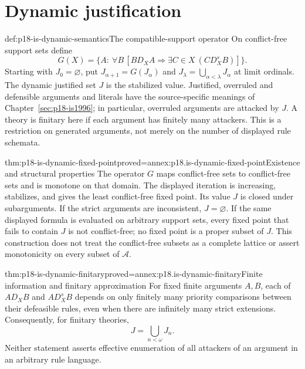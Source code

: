 \section{Dynamic justification}

\begin{hbdefinition}{def:p18-is-dynamic-semantics}{The compatible-support operator}
On conflict-free support sets define
\[
 G(X)=\{A:\ \forall B\,[B D_X A\Rightarrow
                       \exists C\in X\ (C D_X^s B)]\}.
\]
Starting with \(J_0=\varnothing\), put
\(J_{\alpha+1}=G(J_\alpha)\) and
\(J_\lambda=\bigcup_{\alpha<\lambda}J_\alpha\) at limit ordinals.
The dynamic justified set \(J\) is the stabilized value.
Justified, overruled and defensible arguments and literals have
the source-specific meanings of Chapter~\ref{sec:p18-is1996};
in particular, overruled arguments are attacked by \(J\).
A theory is finitary here if each argument has finitely many attackers.
This is a restriction on generated arguments, not merely on the
number of displayed rule schemata.
\end{hbdefinition}

\begin{hbtheorem}{thm:p18-is-dynamic-fixed-point}{proved=annex:p18.is-dynamic-fixed-point}{Existence and structural properties}
The operator \(G\) maps conflict-free sets to conflict-free sets and
is monotone on that domain. The displayed iteration is increasing,
stabilizes, and gives the least conflict-free fixed point.
Its value \(J\) is closed under subarguments. If the strict arguments
are inconsistent, \(J=\varnothing\).
If the same displayed formula is evaluated on arbitrary support sets,
every fixed point that fails to contain \(J\) is not conflict-free;
no fixed point is a proper subset of \(J\).
This construction does not treat the conflict-free subsets as a
complete lattice or assert monotonicity on every subset of
\(\mathcal A\).
\end{hbtheorem}

\begin{hbtheorem}{thm:p18-is-dynamic-finitary}{proved=annex:p18.is-dynamic-finitary}{Finite information and finitary approximation}
For fixed finite arguments \(A,B\), each of
\(A D_XB\) and \(A D_X^sB\) depends on only finitely many priority
comparisons between their defeasible rules, even when there are
infinitely many strict extensions.
Consequently, for finitary theories,
\[
 J=\bigcup_{n<\omega}J_n.
\]
Neither statement asserts effective enumeration of all attackers
of an argument in an arbitrary rule language.
\end{hbtheorem}

